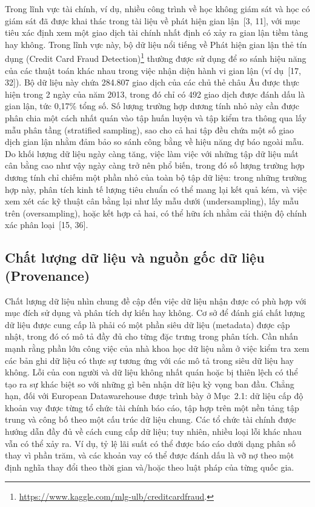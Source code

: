 Trong lĩnh vực tài chính, ví dụ, nhiều công trình về học không giám sát và học có giám sát đã được khai thác trong tài liệu về phát hiện gian lận~[3, 11], với mục tiêu xác định xem một giao dịch tài chính nhất định có xảy ra gian lận tiềm tàng hay không. Trong lĩnh vực này, bộ dữ liệu nổi tiếng về Phát hiện gian lận thẻ tín dụng (Credit Card Fraud Detection)\footnote{\url{https://www.kaggle.com/mlg-ulb/creditcardfraud}.} thường được sử dụng để so sánh hiệu năng của các thuật toán khác nhau trong việc nhận diện hành vi gian lận (ví dụ~[17, 32]). Bộ dữ liệu này chứa 284.807 giao dịch của các chủ thẻ châu Âu được thực hiện trong 2 ngày của năm 2013, trong đó chỉ có 492 giao dịch được đánh dấu là gian lận, tức 0,17\% tổng số. Số lượng trường hợp dương tính nhỏ này cần được phân chia một cách nhất quán vào tập huấn luyện và tập kiểm tra thông qua lấy mẫu phân tầng (stratified sampling), sao cho cả hai tập đều chứa một số giao dịch gian lận nhằm đảm bảo so sánh công bằng về hiệu năng dự báo ngoài mẫu. Do khối lượng dữ liệu ngày càng tăng, việc làm việc với những tập dữ liệu mất cân bằng cao như vậy ngày càng trở nên phổ biến, trong đó số lượng trường hợp dương tính chỉ chiếm một phần nhỏ của toàn bộ tập dữ liệu: trong những trường hợp này, phân tích kinh tế lượng tiêu chuẩn có thể mang lại kết quả kém, và việc xem xét các kỹ thuật cân bằng lại như lấy mẫu dưới (undersampling), lấy mẫu trên (oversampling), hoặc kết hợp cả hai, có thể hữu ích nhằm cải thiện độ chính xác phân loại~[15, 36].

\subsection{Chất lượng dữ liệu và nguồn gốc dữ liệu (Provenance)}

Chất lượng dữ liệu nhìn chung đề cập đến việc dữ liệu nhận được có phù hợp với mục đích sử dụng và phân tích dự kiến hay không. Cơ sở để đánh giá chất lượng dữ liệu được cung cấp là phải có một phần siêu dữ liệu (metadata) được cập nhật, trong đó có mô tả đầy đủ cho từng đặc trưng trong phân tích. Cần nhấn mạnh rằng phần lớn công việc của nhà khoa học dữ liệu nằm ở việc kiểm tra xem các bản ghi dữ liệu có thực sự tương ứng với các mô tả trong siêu dữ liệu hay không. Lỗi của con người và dữ liệu không nhất quán hoặc bị thiên lệch có thể tạo ra sự khác biệt so với những gì bên nhận dữ liệu kỳ vọng ban đầu. Chẳng hạn, đối với European Datawarehouse được trình bày ở Mục~2.1: dữ liệu cấp độ khoản vay được từng tổ chức tài chính báo cáo, tập hợp trên một nền tảng tập trung và công bố theo một cấu trúc dữ liệu chung. Các tổ chức tài chính được hướng dẫn đầy đủ về cách cung cấp dữ liệu; tuy nhiên, nhiều loại lỗi khác nhau vẫn có thể xảy ra. Ví dụ, tỷ lệ lãi suất có thể được báo cáo dưới dạng phân số thay vì phần trăm, và các khoản vay có thể được đánh dấu là vỡ nợ theo một định nghĩa thay đổi theo thời gian và/hoặc theo luật pháp của từng quốc gia.

